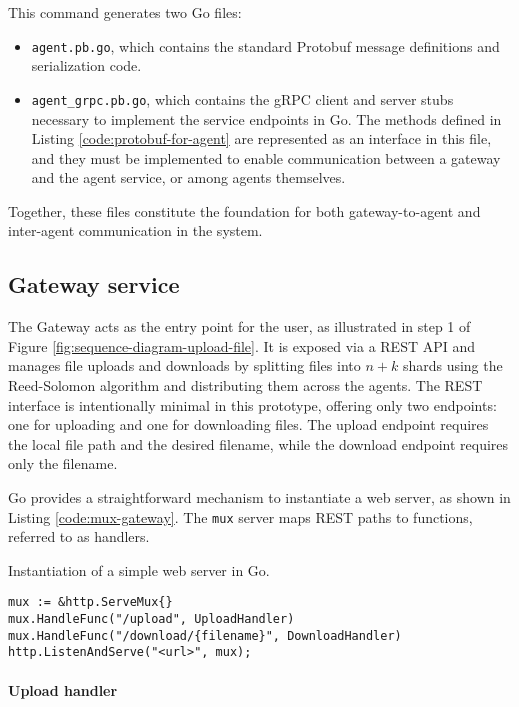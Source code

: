 This command generates two Go files: 
\begin{itemize}
    \item \texttt{agent.pb.go}, which contains the standard Protobuf message definitions and serialization code.
    \item \texttt{agent\_grpc.pb.go}, which contains the gRPC client and server stubs necessary to implement the service endpoints in Go. The methods defined in Listing \ref{code:protobuf-for-agent} are represented as an interface in this file, and they must be implemented to enable communication between a gateway and the agent service, or among agents themselves.
\end{itemize}

Together, these files constitute the foundation for both gateway-to-agent and inter-agent communication in the system.

\subsection{Gateway service} 

The Gateway acts as the entry point for the user, as illustrated in step 1 of Figure \ref{fig:sequence-diagram-upload-file}. It is exposed via a REST API and manages file uploads and downloads by splitting files into $n+k$ shards using the Reed-Solomon algorithm and distributing them across the agents. The REST interface is intentionally minimal in this prototype, offering only two endpoints: one for uploading and one for downloading files. The upload endpoint requires the local file path and the desired filename, while the download endpoint requires only the filename.

Go provides a straightforward mechanism to instantiate a web server, as shown in Listing \ref{code:mux-gateway}. The \texttt{mux} server maps REST paths to functions, referred to as handlers. 

\begin{listing}\caption{Instantiation of a simple web server in Go.}

\label{code:mux-gateway}
\begin{verbatim}
mux := &http.ServeMux{}
mux.HandleFunc("/upload", UploadHandler)
mux.HandleFunc("/download/{filename}", DownloadHandler)
http.ListenAndServe("<url>", mux);
\end{verbatim}
\end{listing}


\paragraph{Upload handler}

